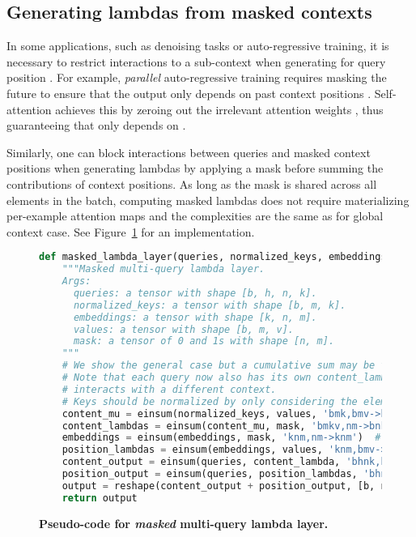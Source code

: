 \documentclass{article} \usepackage{iclr2021_conference,times}
\begin{document}
\subsection{Generating lambdas from masked contexts\label{sec:masked_lambda_layer}}
In some applications, such as denoising tasks or auto-regressive training, it is necessary to restrict interactions to a sub-context  when generating  for query position .
For example, \emph{parallel} auto-regressive training requires masking the future to ensure that the output  only depends on past context positions .
Self-attention achieves this by zeroing out the irrelevant attention weights  ,  thus guaranteeing that  only depends on .

Similarly, one can block interactions between queries and masked context positions when generating lambdas by applying a mask before summing the contributions of context positions. 
As long as the mask is shared across all elements in the batch, computing masked lambdas does not require materializing per-example attention maps and the complexities are the same as for global context case.
See Figure~\ref{fig:masked_lambda_layer_code} for an implementation.

\lstset{style=codestyle}
\begin{figure}[h!]
\small
\begin{lstlisting}[language=python]
def masked_lambda_layer(queries, normalized_keys, embeddings, values, mask):
    """Masked multi-query lambda layer.
    Args:
      queries: a tensor with shape [b, h, n, k].
      normalized_keys: a tensor with shape [b, m, k].
      embeddings: a tensor with shape [k, n, m].
      values: a tensor with shape [b, m, v].
      mask: a tensor of 0 and 1s with shape [n, m].
    """
    # We show the general case but a cumulative sum may be faster for masking the future.
    # Note that each query now also has its own content_lambda since every query 
    # interacts with a different context.
    # Keys should be normalized by only considering the elements in their contexts.
    content_mu = einsum(normalized_keys, values, 'bmk,bmv->bmkv')
    content_lambdas = einsum(content_mu, mask, 'bmkv,nm->bnkv')
    embeddings = einsum(embeddings, mask, 'knm,nm->knm')  # apply mask to embeddings
    position_lambdas = einsum(embeddings, values, 'knm,bmv->bnkv')
    content_output = einsum(queries, content_lambda, 'bhnk,bnkv->bnhv')
    position_output = einsum(queries, position_lambdas, 'bhnk,bnkv->bnhv')
    output = reshape(content_output + position_output, [b, n, d])
    return output
\end{lstlisting}
    \vspace{-0.2cm}
    \caption{\textbf{Pseudo-code for \emph{masked} multi-query lambda layer.}}
    \label{fig:masked_lambda_layer_code}
\end{figure}
\end{document}
